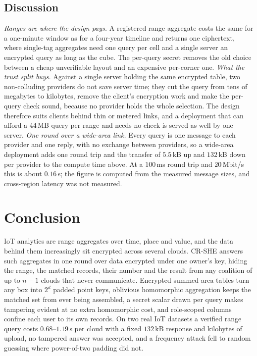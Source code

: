 \subsection{Discussion}
\label{sec:discussion}
\emph{Ranges are where the design pays.} A registered range aggregate costs
the same for a one-minute window as for a four-year timeline and returns one
ciphertext, where single-tag aggregates need one query per cell and a single
server an encrypted query as long as the cube. The per-query secret removes the
old choice between a cheap unverifiable layout and an expensive per-corner one.
\emph{What the trust split buys.} Against a single server holding the same
encrypted table, two non-colluding providers do not save server time; they cut
the query from tens of megabytes to kilobytes, remove the client's encryption
work and make the per-query check sound, because no provider holds the whole
selection. The design therefore suits clients behind thin or
metered links, and a deployment that can afford a 44\,MB query per range and
needs no check is served as well by one server.
\emph{One round over a wide-area link.} Every query is one message to each
provider and one reply, with no exchange between providers, so a wide-area
deployment adds one round trip and the transfer of $5.5$\,kB up and
$132$\,kB down per provider to the compute time above. At a $100$\,ms round
trip and $20$\,Mbit/s this is about $0.16$\,s; the figure is computed from the
measured message sizes, and cross-region latency was not measured.

\section{Conclusion}
\label{sec:conclusion}
IoT analytics are range aggregates over time, place and value, and the data
behind them increasingly sit encrypted across several clouds. CR-SHE answers
such aggregates in one round over data encrypted under one owner's key, hiding
the range, the matched records, their number and the result from any coalition
of up to $n-1$ clouds that never communicate. Encrypted summed-area tables turn
any box into $2^d$ padded point keys, oblivious homomorphic aggregation keeps
the matched set from ever being assembled, a secret scalar drawn per query
makes tampering evident at no extra homomorphic cost, and role-scoped columns
confine each user to its own records. On two real IoT datasets a verified
range query costs $0.68$--$1.19$\,s per cloud with a fixed $132$\,kB response
and kilobytes of upload, no tampered answer was accepted, and a frequency
attack fell to random guessing where power-of-two padding did not.

